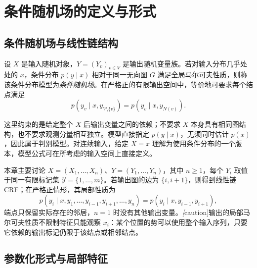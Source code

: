\section{条件随机场的定义与形式}
\label{sec:lihang-crf-representations}

\subsection{条件随机场与线性链结构}
\label{subsec:lihang-crf-definition}

\begin{definition}
\label{def:lihang-crf}
设 $X$ 是输入随机对象，$Y=(Y_v)_{v\in V}$ 是输出随机变量族。若对输入分布几乎处处的 $x$，条件分布 $p(y\mid x)$ 相对于同一无向图 $G$ 满足全局马尔可夫性质，则称该条件分布模型为\emph{条件随机场}。在严格正的有限输出空间中，等价地可要求每个结点满足
\begin{equation}
\label{eq:lihang-crf-conditional-markov}
  p(y_v\mid x,y_{V\setminus\{v\}})
  =p(y_v\mid x,y_{N(v)}).
\end{equation}
\end{definition}

这里约束的是给定整个 $X$ 后输出变量之间的依赖；不要求 $X$ 本身具有相同图结构，也不要求观测分量相互独立。模型直接指定 $p(y\mid x)$，无须同时估计 $p(x)$，因此属于判别模型。对连续输入，给定 $X=x$ 理解为使用条件分布的一个版本，模型公式可在所考虑的输入空间上直接定义。

本章主要讨论 $X=(X_1,\ldots,X_n)$、$Y=(Y_1,\ldots,Y_n)$，其中 $n\geq1$，每个 $Y_i$ 取值于同一有限标记集 $\mathcal Y=\{1,\ldots,m\}$。若输出图的边为 $\{i,i+1\}$，则得到线性链 CRF；在严格正情形，其局部性质为
\[
  p(y_i\mid x,y_1,\ldots,y_{i-1},y_{i+1},\ldots,y_n)
  =p(y_i\mid x,y_{i-1},y_{i+1}),
\]
端点只保留实际存在的邻居，$n=1$ 时没有其他输出变量。\emph[caution]{输出的局部马尔可夫性质不限制特征只能观察 $x_i$}：某个位置的势可以使用整个输入序列，只要它依赖的输出标记仍限于该结点或相邻结点。

\subsection{参数化形式与局部特征}
\label{subsec:lihang-crf-features}

